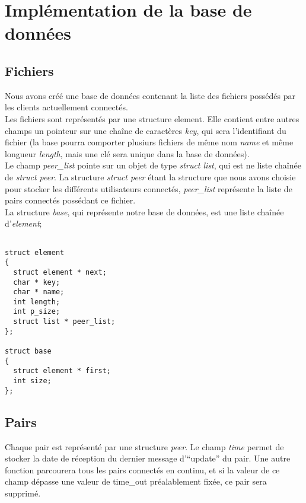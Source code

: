 
\section{Implémentation de la base de données}
\subsection{Fichiers}
Nous avons créé une base de données contenant la liste des fichiers possédés par les clients actuellement connectés. \\
Les fichiers sont représentés par une structure element. Elle contient entre autres champs un pointeur sur une chaîne de caractères \textit{key}, qui sera l'identifiant du fichier (la base pourra comporter plusiurs fichiers de même nom \textit{name} et même longueur \textit{length}, mais une clé sera unique dans la base de données). \\
Le champ \textit{peer\_list} pointe sur un objet de type \textit{struct list}, qui est ne liste chaînée de \textit{struct peer}. La structure \textit{struct peer} étant la structure que nous avons choisie pour stocker les différents utilisateurs connectés, \textit{peer\_list} représente la liste de pairs connectés possédant ce fichier.\\ 
La structure \textit{base}, qui représente notre base de données, est une liste chaînée d'\textit{element};\\
 
\begin{verbatim}

struct element
{
  struct element * next;
  char * key;
  char * name;
  int length;
  int p_size;
  struct list * peer_list; 
};

struct base
{
  struct element * first;
  int size;
};

\end{verbatim}

\subsection{Pairs}
  
Chaque pair est représenté par une structure \textit{peer}. Le champ \textit{time} permet de stocker la date de réception du dernier message d'``update'' du pair. Une autre fonction parcourera tous les pairs connectés en continu, et si la valeur de ce champ dépasse une valeur de time\_out préalablement fixée, ce pair sera supprimé.\\

